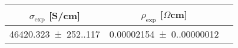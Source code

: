 \begin{tabular}{ccc}
\toprule
$\sigma_{\exp}$ [S/cm] & $\rho_{\exp}$ [$\Omega$cm] \\
\midrule
\num{46420.323(252.117)} & \num{0.00002154(0.00000012)} \\
\bottomrule
\end{tabular}
